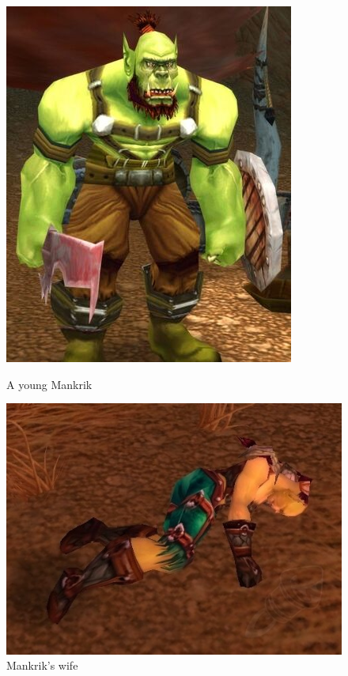 \documentclass{report}
\begin{document}
\begin{figure}[!ht]
\centering
\begin{minipage}{0.4\textwidth}
	\includegraphics[width=\textwidth]{mankrik_young}
	\caption{A young Mankrik}
\end{minipage}
\begin{minipage}{0.4\textwidth}
	\includegraphics[width=\textwidth]{mankrik_wife}
	\caption{Mankrik's wife}
\end{minipage}

\end{figure}
\FloatBarrier
\end{document}
